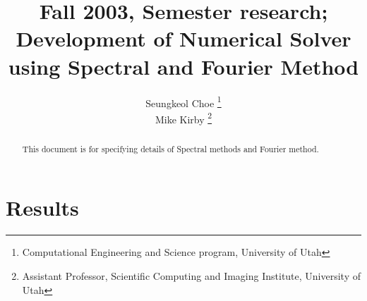 \documentclass[11pt,letterpaper]{article}
\begin{document}
\title{{\normalsize Fall 2003, Semester research;}\\
        {\bfseries Development of Numerical Solver using Spectral and Fourier Method}
}

\vfill
\author{Seungkeol Choe \thanks{Computational Engineering and Science program, University of Utah}\\
        Mike Kirby \thanks{Assistant Professor, Scientific Computing and Imaging Institute, University of Utah}
       }

\renewcommand{\today}{Aug 28th, 2003}

\maketitle

\begin{abstract}
This document is for specifying details of Spectral methods and
Fourier method.
\end{abstract}

\tableofcontents

\clearpage



\clearpage

\clearpage
\section {Results}






%



%
\end{document}
